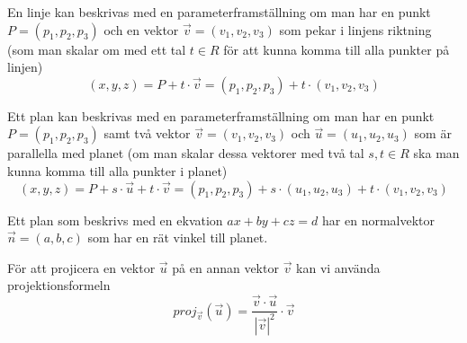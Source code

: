 \documentclass[../main.tex]{subfiles}
\begin{document}
\begin{formel}
\label{parameterlinje} 
En linje kan beskrivas med en parameterframställning om man har en punkt $P = (p_1, p_2, p_3)$ och en vektor $\vec{v}=(v_1, v_2, v_3)$ som pekar i linjens riktning (som man skalar om med ett tal $t \in R$ för att kunna komma till alla punkter på linjen)
\[(x, y, z) = P + t \cdot \vec{v} = (p_1, p_2, p_3) + t\cdot (v_1, v_2, v_3)\]
\end{formel}


\begin{formel}
\label{parameterplan} 
Ett plan kan beskrivas med en parameterframställning om man har en punkt $P = (p_1, p_2, p_3)$ samt två vektor $\vec{v}=(v_1, v_2, v_3)$ och $\vec{u}=(u_1, u_2, u_3)$ som är parallella med planet (om man skalar dessa vektorer med två tal $s, t \in R$ ska man kunna komma till alla punkter i planet)
\[(x, y, z) = P + s \cdot \vec{u} + t \cdot \vec{v} = (p_1, p_2, p_3) + s\cdot (u_1, u_2, u_3) + t \cdot (v_1, v_2, v_3)\]
\end{formel}


\begin{formel}
\label{normalplan} 
Ett plan som beskrivs med en ekvation $ax + by + cz = d$ har en normalvektor $\vec{n} = (a, b, c)$ som har en rät vinkel till planet.
\end{formel}

\begin{formel}
\label{projektionsformeln} 
För att projicera en vektor $\vec{u}$ på en annan vektor $\vec{v}$ kan vi använda projektionsformeln
$$proj_{\vec{v}}(\vec{u})=\frac{\vec{v}\cdot\vec{u}}{|\vec{v}|^2}\cdot\vec{v}$$

\end{formel}
\end{document}
